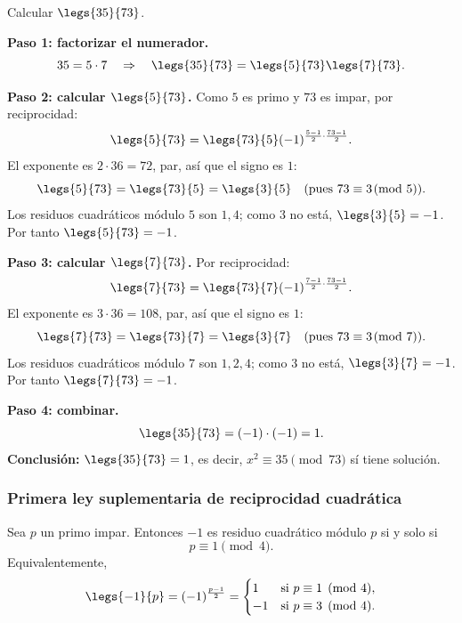 \begin{ejemplo}
Calcular $\legs{35}{73}$.
\end{ejemplo}
\begin{solucion}
\textbf{Paso 1: factorizar el numerador.}
\[
35 = 5 \cdot 7 \quad\Rightarrow\quad \legs{35}{73} = \legs{5}{73} \legs{7}{73}.
\]

\textbf{Paso 2: calcular $\legs{5}{73}$.}
Como $5$ es primo y $73$ es impar, por reciprocidad:
\[
\legs{5}{73} = \legs{73}{5} (-1)^{\frac{5-1}{2} \cdot \frac{73-1}{2}}.
\]
El exponente es $2 \cdot 36 = 72$, par, así que el signo es $1$:
\[
\legs{5}{73} = \legs{73}{5} = \legs{3}{5} \quad (\text{pues } 73 \equiv 3 \!\!\pmod 5).
\]
Los residuos cuadráticos módulo $5$ son $1,4$; como $3$ no está, $\legs{3}{5} = -1$. Por tanto $\legs{5}{73} = -1$.

\textbf{Paso 3: calcular $\legs{7}{73}$.}
Por reciprocidad:
\[
\legs{7}{73} = \legs{73}{7} (-1)^{\frac{7-1}{2} \cdot \frac{73-1}{2}}.
\]
El exponente es $3 \cdot 36 = 108$, par, así que el signo es $1$:
\[
\legs{7}{73} = \legs{73}{7} = \legs{3}{7} \quad (\text{pues } 73 \equiv 3 \!\!\pmod 7).
\]
Los residuos cuadráticos módulo $7$ son $1,2,4$; como $3$ no está, $\legs{3}{7} = -1$. Por tanto $\legs{7}{73} = -1$.

\textbf{Paso 4: combinar.}
\[
\legs{35}{73} = (-1)\cdot(-1) = 1.
\]
\textbf{Conclusión:} $\legs{35}{73} = 1$, es decir, $x^2 \equiv 35 \pmod{73}$ sí tiene solución.
\end{solucion}

\subsubsection{Primera ley suplementaria de reciprocidad cuadrática}

\begin{teorema}
Sea $p$ un primo impar. Entonces $-1$ es residuo cuadrático módulo $p$ si y solo si
\[
p \equiv 1 \pmod 4.
\]
Equivalentemente,
\[
\legs{-1}{p} = (-1)^{\frac{p-1}{2}} =
\begin{cases}
1 & \text{si } p \equiv 1 \pmod 4, \\
-1 & \text{si } p \equiv 3 \pmod 4.
\end{cases}
\]
\end{teorema}

